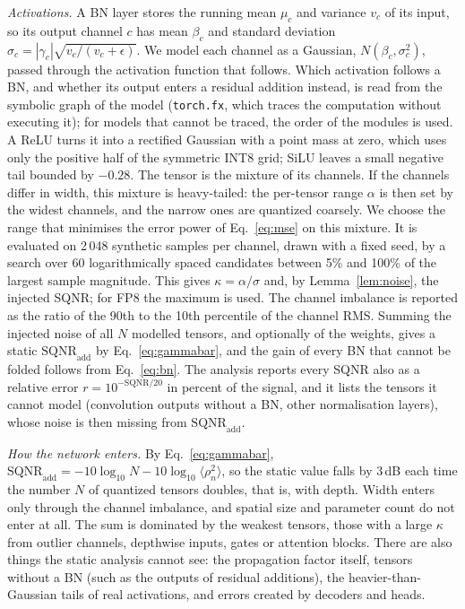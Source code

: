 \documentclass[pdflatex,sn-mathphys-num]{sn-jnl}%
\theoremstyle{thmstyleone}%
\theoremstyle{thmstyletwo}%
\theoremstyle{thmstylethree}%
\begin{document}
\emph{Activations.} A BN layer stores the running mean $\mu_c$ and variance $v_c$ of its input, so its output channel $c$ has mean $\beta_c$ and standard deviation $\sigma_c=|\gamma_c|\sqrt{v_c/(v_c+\epsilon)}$. We model each channel as a Gaussian, $N(\beta_c,\sigma_c^2)$, passed through the activation function that follows. Which activation follows a BN, and whether its output enters a residual addition instead, is read from the symbolic graph of the model (\texttt{torch.fx}, which traces the computation without executing it); for models that cannot be traced, the order of the modules is used. A ReLU turns it into a rectified Gaussian with a point mass at zero, which uses only the positive half of the symmetric INT8 grid; SiLU leaves a small negative tail bounded by $-0.28$. The tensor is the mixture of its channels. If the channels differ in width, this mixture is heavy-tailed: the per-tensor range $\alpha$ is then set by the widest channels, and the narrow ones are quantized coarsely. We choose the range that minimises the error power of Eq.~\eqref{eq:mse} on this mixture. It is evaluated on 2\,048 synthetic samples per channel, drawn with a fixed seed, by a search over 60 logarithmically spaced candidates between 5\% and 100\% of the largest sample magnitude. This gives $\kappa=\alpha/\sigma$ and, by Lemma~\ref{lem:noise}, the injected SQNR; for FP8 the maximum is used. The channel imbalance is reported as the ratio of the 90th to the 10th percentile of the channel RMS. Summing the injected noise of all $N$ modelled tensors, and optionally of the weights, gives a static $\mathrm{SQNR}_\text{add}$ by Eq.~\eqref{eq:gammabar}, and the gain of every BN that cannot be folded follows from Eq.~\eqref{eq:bn}. The analysis reports every SQNR also as a relative error $r=10^{-\mathrm{SQNR}/20}$ in percent of the signal, and it lists the tensors it cannot model (convolution outputs without a BN, other normalisation layers), whose noise is then missing from $\mathrm{SQNR}_\text{add}$.

\emph{How the network enters.} By Eq.~\eqref{eq:gammabar}, $\mathrm{SQNR}_\text{add}=-10\log_{10}N-10\log_{10}\langle\rho_n^2\rangle$, so the static value falls by 3\,dB each time the number $N$ of quantized tensors doubles, that is, with depth. Width enters only through the channel imbalance, and spatial size and parameter count do not enter at all. The sum is dominated by the weakest tensors, those with a large $\kappa$ from outlier channels, depthwise inputs, gates or attention blocks. There are also things the static analysis cannot see: the propagation factor itself, tensors without a BN (such as the outputs of residual additions), the heavier-than-Gaussian tails of real activations, and errors created by decoders and heads.
\end{document}
